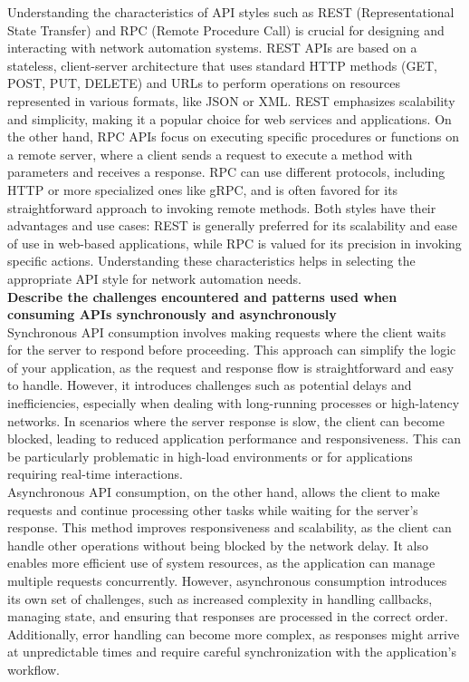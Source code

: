 \documentclass{article}
\begin{document}
	 Understanding the characteristics of API styles such as REST (Representational State Transfer) and RPC (Remote Procedure Call) is crucial for designing and interacting with network automation systems. REST APIs are based on a stateless, client-server architecture that uses standard HTTP methods (GET, POST, PUT, DELETE) and URLs to perform operations on resources represented in various formats, like JSON or XML. REST emphasizes scalability and simplicity, making it a popular choice for web services and applications. On the other hand, RPC APIs focus on executing specific procedures or functions on a remote server, where a client sends a request to execute a method with parameters and receives a response. RPC can use different protocols, including HTTP or more specialized ones like gRPC, and is often favored for its straightforward approach to invoking remote methods. Both styles have their advantages and use cases: REST is generally preferred for its scalability and ease of use in web-based applications, while RPC is valued for its precision in invoking specific actions. Understanding these characteristics helps in selecting the appropriate API style for network automation needs.\\

\textbf{Describe the challenges encountered and patterns used when consuming APIs synchronously and asynchronously}\\

	Synchronous API consumption involves making requests where the client waits for the server to respond before proceeding. This approach can simplify the logic of your application, as the request and response flow is straightforward and easy to handle. However, it introduces challenges such as potential delays and inefficiencies, especially when dealing with long-running processes or high-latency networks. In scenarios where the server response is slow, the client can become blocked, leading to reduced application performance and responsiveness. This can be particularly problematic in high-load environments or for applications requiring real-time interactions.\\

	Asynchronous API consumption, on the other hand, allows the client to make requests and continue processing other tasks while waiting for the server's response. This method improves responsiveness and scalability, as the client can handle other operations without being blocked by the network delay. It also enables more efficient use of system resources, as the application can manage multiple requests concurrently. However, asynchronous consumption introduces its own set of challenges, such as increased complexity in handling callbacks, managing state, and ensuring that responses are processed in the correct order. Additionally, error handling can become more complex, as responses might arrive at unpredictable times and require careful synchronization with the application's workflow.\\
\end{document}
